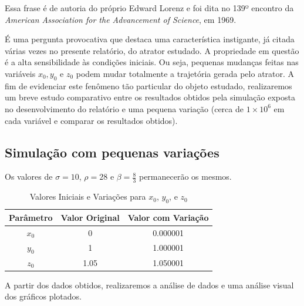\documentclass[12pt, a4paper]{article}
\begin{document}
Essa frase é de autoria do próprio Edward Lorenz e foi dita no 139º
encontro da \textit{American Association for the Advancement of Science}, em
1969.

É uma pergunta provocativa que destaca uma característica instigante, já
citada várias vezes no presente relatório, do atrator estudado. A propriedade
em questão é a alta sensibilidade às condições iniciais. Ou seja, pequenas
mudanças feitas nas variáveis $x_0, y_0$ e $z_0$ podem mudar totalmente a
trajetória gerada pelo atrator. A fim de evidenciar este fenômeno tão
particular do objeto estudado, realizaremos um breve estudo comparativo entre
os resultados obtidos pela simulação exposta no desenvolvimento do relatório e
uma pequena variação (cerca de $1 \times 10^6$ em cada variável e comparar os
resultados obtidos).

\subsection{Simulação com pequenas variações}

Os valores de $\sigma=10$, $\rho = 28$ e $\beta = \frac{8}{3}$ permanecerão
os mesmos.

\begin{table}[htbp]
    \centering
    \caption{Valores Iniciais e Variações para \(x_0\), \(y_0\), e \(z_0\)}
    \begin{tabular}{|c|c|c|}
        \hline
        Parâmetro & Valor Original & Valor com Variação \\
        \hline
        $x_0$     & 0              & 0.000001           \\ \hline
        $y_0$     & 1              & 1.000001           \\ \hline
        $z_0$     & 1.05           & 1.050001           \\ \hline
    \end{tabular}
\end{table}

A partir dos dados obtidos, realizaremos a análise de dados e uma análise
visual dos gráficos plotados.

\newpage
\end{document}
